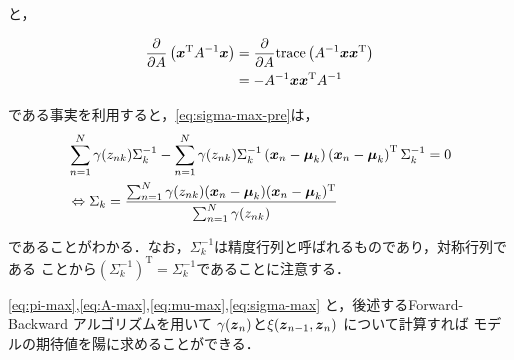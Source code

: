 と，

\begin{align}
  \displaystyle \frac{\partial}{\partial A} \left ( \mbox{\boldmath $x$}^\mathrm{T}A^{-1}\mbox{\boldmath $x$}\right ) &= \frac{\partial}{\partial A}\mathrm{trace}\left ( A^{-1} \mbox{\boldmath $x$} \mbox{\boldmath $x$}^\mathrm{T} \right ) \\
  &= -A^{-1} \mbox{\boldmath $x$} \mbox{\boldmath $x$}^\mathrm{T} A^{-1}
\end{align}

である事実を利用すると\footnotemark，\eqref{eq:sigma-max-pre}は，
\begin{align}
  &\sum_{n=1}^{N}\gamma(z_{nk})  \Sigma_k^{-1} - \sum_{n=1}^{N}\gamma(z_{nk}) \Sigma_k^{-1}  \left (\mbox{\boldmath $x$}_n - \mbox{\boldmath $\mu$}_k \right ) \left ( \mbox{\boldmath $x$}_n - \mbox{\boldmath $\mu$}_k \right ) ^\mathrm{T} \Sigma_k^{-1} = 0 \\
  &\Leftrightarrow \Sigma_k=\frac{\sum_{n=1}^N\gamma(z_{nk})(\mbox{\boldmath $x$}_n-\mbox{\boldmath $\mu$}_k)(\mbox{\boldmath $x$}_n-\mbox{\boldmath $\mu$}_k)^{\mathrm{T}}}{\sum_{n=1}^N\gamma(z_{nk})} \label{eq:sigma-max}
\end{align}


であることがわかる．なお，$\Sigma_k^{-1}$は精度行列と呼ばれるものであり，対称行列である
ことから$\left (\Sigma_k^{-1} \right )^{\mathrm{T}} = \Sigma_k^{-1}$であることに注意する．

\eqref{eq:pi-max},\eqref{eq:A-max},\eqref{eq:mu-max},\eqref{eq:sigma-max} と，後述するForward-Backward アルゴリズムを用いて
$\gamma(\mbox{\boldmath $z$}_n)$と$\xi(\mbox{\boldmath $z$}_{n-1},\mbox{\boldmath $z$}_n)$
について計算すれば
モデルの期待値を陽に求めることができる．

